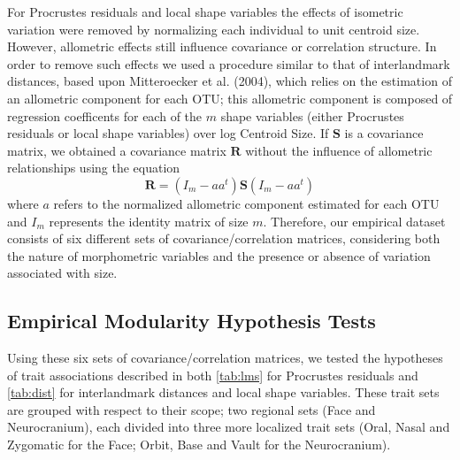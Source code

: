 \documentclass[12pt,]{article}
\begin{document}
For Procrustes residuals and local shape variables the effects of
isometric variation were removed by normalizing each individual to unit
centroid size. However, allometric effects still influence covariance or
correlation structure. In order to remove such effects we used a
procedure similar to that of interlandmark distances, based upon
Mitteroecker et al. (2004), which relies on the estimation of an
allometric component for each OTU; this allometric component is composed
of regression coefficents for each of the $m$ shape variables (either
Procrustes residuals or local shape variables) over log Centroid Size.
If $\mathbf{S}$ is a covariance matrix, we obtained a covariance matrix
$\mathbf{R}$ without the influence of allometric relationships using the
equation \[
\mathbf{R} = (I_m - aa^t) \mathbf{S} (I_m - aa^t)
\] where $a$ refers to the normalized allometric component estimated for
each OTU and $I_m$ represents the identity matrix of size $m$.
Therefore, our empirical dataset consists of six different sets of
covariance/correlation matrices, considering both the nature of
morphometric variables and the presence or absence of variation
associated with size.

\subsection{Empirical Modularity Hypothesis
Tests}\label{empirical-modularity-hypothesis-tests}

Using these six sets of covariance/correlation matrices, we tested the
hypotheses of trait associations described in both \autoref{tab:lms} for
Procrustes residuals and \autoref{tab:dist} for interlandmark distances
and local shape variables. These trait sets are grouped with respect to
their scope; two regional sets (Face and Neurocranium), each divided
into three more localized trait sets (Oral, Nasal and Zygomatic for the
Face; Orbit, Base and Vault for the Neurocranium).
\end{document}
